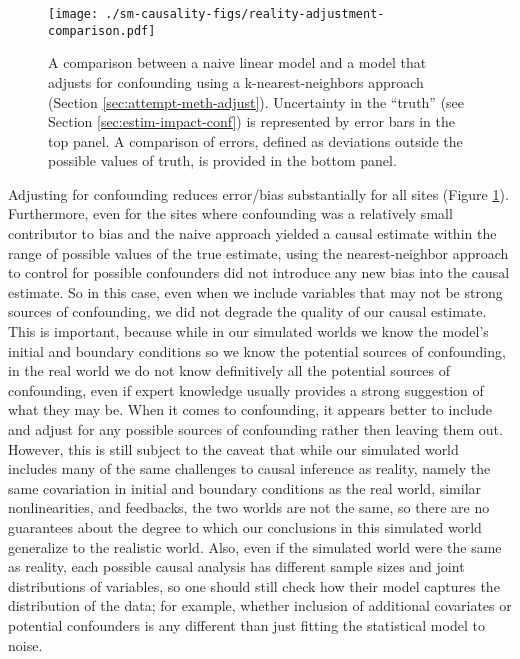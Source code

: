 \documentclass[12pt]{article}
\begin{document}
\begin{figure}
  \texttt{[image: ./sm-causality-figs/reality-adjustment-comparison.pdf]}
  \caption{A comparison between a naive linear model and a model that
    adjusts for confounding using a k-nearest-neighbors approach
    (Section \ref{sec:attempt-meth-adjust}). Uncertainty in the
    ``truth'' (see Section \ref{sec:estim-impact-conf}) is represented
    by error bars in the top panel. A comparison of errors, defined as
    deviations outside the possible values of truth, is provided in
    the bottom panel.  }
\label{fig:reality-adjustment}
\end{figure}

Adjusting for confounding reduces error/bias substantially for all
sites (Figure \ref{fig:reality-adjustment}). Furthermore, even for the
sites where confounding was a relatively small contributor to bias and
the naive approach yielded a causal estimate within the range of
possible values of the true estimate, using the nearest-neighbor
approach to control for possible confounders did not introduce any new
bias into the causal estimate. So in this case, even when we include
variables that may not be strong sources of confounding, we did not
degrade the quality of our causal estimate. This is important, because
while in our simulated worlds we know the model's initial and boundary
conditions so we know the potential sources of confounding, in the
real world we do not know definitively all the potential sources of
confounding, even if expert knowledge usually provides a strong
suggestion of what they may be. When it comes to confounding, it
appears better to include and adjust for any possible sources of
confounding rather then leaving them out. However, this is still
subject to the caveat that while our simulated world includes many of
the same challenges to causal inference as reality, namely the same
covariation in initial and boundary conditions as the real world,
similar nonlinearities, and feedbacks, the two worlds are not the
same, so there are no guarantees about the degree to which our
conclusions in this simulated world generalize to the realistic
world. Also, even if the simulated world were the same as reality,
each possible causal analysis has different sample sizes and joint
distributions of variables, so one should still check how their model
captures the distribution of the data; for example, whether inclusion
of additional covariates or potential confounders is any different
than just fitting the statistical model to noise.
\end{document}
